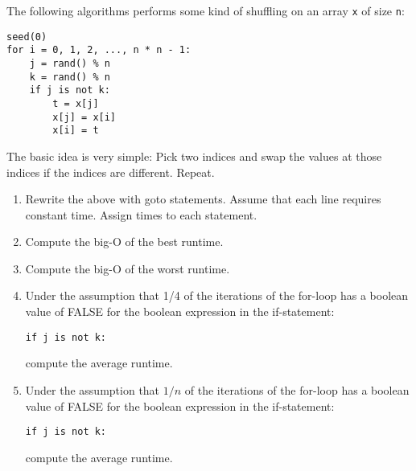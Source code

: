 The following algorithms performs some kind of shuffling
on an array \verb!x! of size \verb!n!:
\begin{Verbatim}[frame=single, fontsize=\footnotesize]
seed(0)
for i = 0, 1, 2, ..., n * n - 1:
    j = rand() % n
    k = rand() % n
    if j is not k:
        t = x[j]
        x[j] = x[i]
        x[i] = t
\end{Verbatim}
The basic idea is very simple: Pick two indices and swap the values
at those indices if the indices are different. Repeat.
\begin{enumerate}[nosep,label=(\alph*)]
\item
  Rewrite the above with goto statements.
  Assume that each line requires constant time.
  Assign times to each statement.
\item
  Compute the big-O of the best runtime. 
\item
  Compute the big-O of the worst runtime.
\item
  Under the assumption that 1/4 of the iterations
  of the for-loop has a boolean value of FALSE for the boolean expression
  in the if-statement:
\begin{Verbatim}[frame=single, fontsize=\footnotesize]
    if j is not k:
\end{Verbatim}
  compute the average runtime.
\item
  Under the assumption that $1/n$ of the iterations
  of the for-loop has a boolean value of FALSE for the boolean expression
  in the if-statement:
\begin{Verbatim}[frame=single, fontsize=\footnotesize]
    if j is not k:
\end{Verbatim}
compute the average runtime.
\end{enumerate}
